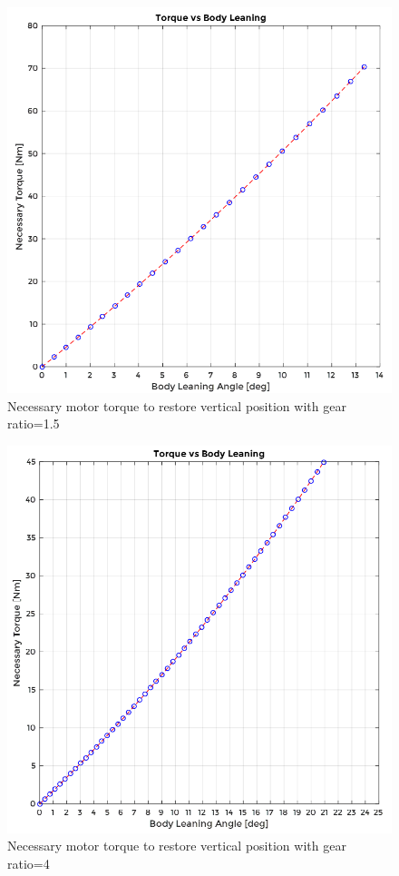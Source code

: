 \begin{figure}[h!]
	\includegraphics[width=0.95\linewidth]{figs/05/sim/gear15_1}
	\caption{Necessary motor torque to restore vertical position with gear ratio=1.5}
\end{figure}

\begin{figure}[h!]
	\includegraphics[width=0.95\linewidth]{figs/05/sim/gear4_1}
	\caption{Necessary motor torque to restore vertical position with gear ratio=4}
\end{figure}

